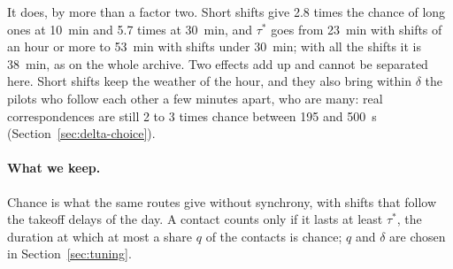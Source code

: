 It does, by more than a factor two. Short shifts give 2.8 times the chance of long ones at 10~min
and 5.7 times at 30~min, and $\tau^*$ goes from 23~min with shifts of an hour or more to 53~min
with shifts under 30~min; with all the shifts it is 38~min, as on the whole archive. Two effects
add up and cannot be separated here. Short shifts keep the weather of the hour, and they also
bring within $\delta$ the pilots who follow each other a few minutes apart, who are many: real
correspondences are still 2 to 3 times chance between 195 and 500~s
(Section~\ref{sec:delta-choice}).

\paragraph{What we keep.} Chance is what the same routes give without synchrony, with shifts that
follow the takeoff delays of the day. A contact counts only if it lasts at least $\tau^*$, the
duration at which at most a share $q$ of the contacts is chance; $q$ and $\delta$ are chosen in
Section~\ref{sec:tuning}.
